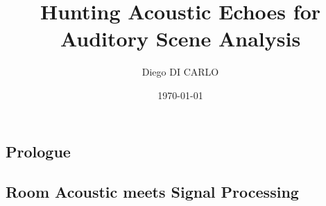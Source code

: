 \documentclass[pdftex,dvipsnames]{dissertation}
\title{Hunting Acoustic Echoes for Auditory Scene Analysis}
\author{Diego DI CARLO}
\date{\today}
\begin{document}
\frontmatter{}

% 



\blankpage{}

\blankpage{}


\cleardoublepage{}

\doparttoc[n]
\tableofcontents*{}
\clearpage{}


\cleardoublepage{}
\clearpage{}






\cleardoublepage{}

\setcounter{mtc}{9}

\mainmatter{}

\begin{fullwidth}
    \part{Prologue}
\end{fullwidth}
\parttoc[n]
\cleardoublepage{}

% 

\begin{fullwidth}
    \part{Room Acoustic meets Signal Processing}\label{pt:background}
\end{fullwidth}
% 
% 
\end{document}
